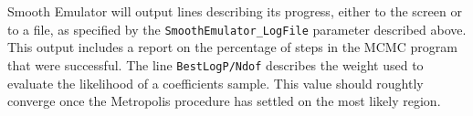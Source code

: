 \documentclass[main.tex]{subfiles}
\begin{document}
Smooth Emulator will output lines describing its progress, either to the screen or to a file, as specified by the {\tt SmoothEmulator\_LogFile} parameter described above. This output includes a report on the percentage of steps in the MCMC program that were successful. The line {\tt BestLogP/Ndof} describes the weight used to evaluate the likelihood of a coefficients sample. This value should roughtly converge once the Metropolis procedure has settled on the most likely region. 
\end{document}
